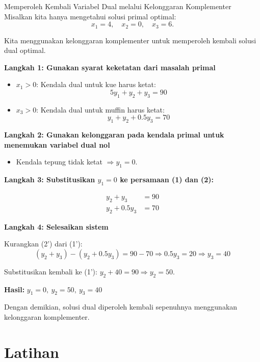 \begin{example}{Memperoleh Kembali Variabel Dual melalui Kelonggaran Komplementer}
Misalkan kita hanya mengetahui solusi primal optimal:
\[
x_1 = 4,\quad x_2 = 0,\quad x_3 = 6.
\]

Kita menggunakan kelonggaran komplementer untuk memperoleh kembali solusi dual optimal.

\textbf{Langkah 1: Gunakan syarat keketatan dari masalah primal}

\begin{itemize}
\item \(x_1 > 0\): Kendala dual untuk kue harus ketat:
\[
5y_1 + y_2 + y_3 = 90 \tag{1}
\]
\item \(x_3 > 0\): Kendala dual untuk muffin harus ketat:
\[
y_1 + y_2 + 0.5y_3 = 70 \tag{2}
\]
\end{itemize}

\textbf{Langkah 2: Gunakan kelonggaran pada kendala primal untuk menemukan variabel dual nol}

\begin{itemize}
\item Kendala tepung tidak ketat \( \Rightarrow y_1 = 0 \).
\end{itemize}

\textbf{Langkah 3: Substitusikan \(y_1 = 0\) ke persamaan (1) dan (2):}

\begin{align*}
y_2 + y_3 &= 90 \tag{1'} \\
y_2 + 0.5y_3 &= 70 \tag{2'}
\end{align*}

\textbf{Langkah 4: Selesaikan sistem}

Kurangkan (2') dari (1'):
\[
(y_2 + y_3) - (y_2 + 0.5y_3) = 90 - 70 \Rightarrow 0.5y_3 = 20 \Rightarrow y_3 = 40
\]

Substitusikan kembali ke (1'): \( y_2 + 40 = 90 \Rightarrow y_2 = 50 \).

\textbf{Hasil: } \( y_1 = 0,\ y_2 = 50,\ y_3 = 40 \)

Dengan demikian, solusi dual diperoleh kembali sepenuhnya menggunakan kelonggaran komplementer.
\end{example}

\section{Latihan}


